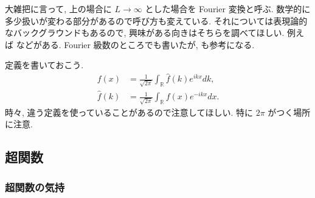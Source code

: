 \documentclass[openany, a4paper, oneside]{book}
\theoremstyle{break}
\theoremstyle{breakdefn}
\begin{document}
大雑把に言って, 上の場合に $L \to \infty$ とした場合を Fourier 変換と呼ぶ.
数学的に多少扱いが変わる部分があるので呼び方も変えている.
それについては表現論的なバックグラウンドもあるので, 興味がある向きはそちらを調べてほしい.
例えば \cite{KobayashiOshima1} などがある.
Fourier 級数のところでも書いたが, \cite{SeizoIto1, LiebLoss1} も参考になる.

定義を書いておこう.
\begin{align}
 f (x)
 &=
 \frac{1}{\sqrt{2 \pi}} \int_{ \mathbb{R}} \hat{f}(k) e^{ikx} dk, \\
 \hat{f}(k)
 &=
 \frac{1}{\sqrt{2 \pi}}  \int_{\mathbb{R}} f (x) e^{-ikx} dx.
\end{align}
時々, 違う定義を使っていることがあるので注意してほしい.
特に $2 \pi$ がつく場所に注意.
\subsection{超関数}
\label{sec-11-3-17-3}
\subsubsection{超関数の気持}
\label{sec-11-3-17-3-1}
\end{document}
